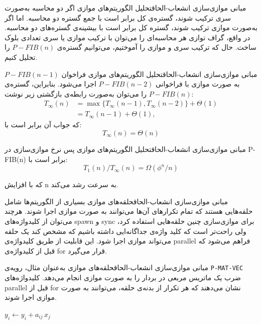 \begin{itemframe-s}{مبانی موازی‌سازی انشعاب-الحاق}{تحلیل الگوریتم‌های موازی}
\itm[1]
اگر دو محاسبه به‌صورت سری ترکیب شوند، گستره‌ی کل برابر است با جمع گستره دو محاسبه.
\itm[2]
اما اگر به‌صورت موازی ترکیب شوند، گستره کل برابر است با بیشینه‌ی گستره‌های دو محاسبه.
\itm
در واقع، گراف توازی هر محاسبه‌ای را می‌توان با ترکیب موازی یا سری تعدادی بلوک ساخت.
\itm
حال که ترکیب سری و موازی را آموختیم، می‌توانیم گستره‌ی
$P-FIB(n)$
را تحلیل کنیم.
\end{itemframe-s}


\begin{itemframe-s}{مبانی موازی‌سازی انشعاب-الحاق}{تحلیل الگوریتم‌های موازی}
\itm
فراخوان
$P-FIB(n-1)$
به صورت موازی با فراخوانی
$P-FIB(n-2)$
اجرا می‌شود. بنابراین، گستره‌ی
$P-FIB(n)$
را می‌توان به‌صورت رابطه‌ی بازگشتی زیر نوشت:
\begin{align*}
T_∞(n) &= \max\{T_∞(n-1), T_∞(n-2)\} + \Theta(1)\\
        &= T_∞(n-1) + \Theta(1),
\end{align*}
\itm
که جواب آن برابر است با:
$$T_∞(n) = \Theta(n)$$
\end{itemframe-s}


\begin{itemframe-s}{مبانی موازی‌سازی انشعاب-الحاق}{تحلیل الگوریتم‌های موازی}
\itm
پس نرخ موازی‌سازی در P-FIB(n) برابر است با:
$$
T_1(n) / T_∞(n) = \Omega(\phi^n / n)
$$

که با افزایش n به ‌سرعت رشد می‌کند.
\end{itemframe-s}


\begin{itemframe-s}{مبانی موازی‌سازی انشعاب-الحاق}{حلقه‌های موازی}
\itm
بسیاری از الگوریتم‌ها شامل حلقه‌هایی هستند که تمام تکرارهای آن‌ها می‌توانند به صورت موازی اجرا شوند.
\itm
هرچند می‌توان از کلیدواژه‌های spawn و sync برای موازی‌سازی چنین حلقه‌هایی استفاده کرد، ولی راحت‌تر است که کلید واژه‌ی جداگانه‌ایی داشته باشیم که مشخص کند یک حلقه می‌تواند موازی اجرا شود.
این قابلیت از طریق کلیدواژه‌ی parallel فراهم می‌شود که قبل از کلیدواژه‌ی for قرار می‌گیرد.



\end{itemframe-s}


\begin{itemframe-s}{مبانی موازی‌سازی انشعاب-الحاق}{حلقه‌های موازی}
\itm
به‌عنوان مثال، رویه‌ی
\texttt{P-MAT-VEC}
ضرب یک ماتریس مربعی در بردار را به صورت موازی انجام می‌دهد. کلیدواژه‌های parallel قبل از for نشان می‌دهند که هر تکرار از بدنه‌ی حلقه، می‌توانند به صورت موازی اجرا شوند.
\begin{algorithm}[H]\alglr
\caption{P-MAT-VEC}
\begin{algorithmic}[1]
   
     
      \State $y_i \gets y_i + a_{ij} \, x_j$
    \EndFor
  \EndpFor
\end{algorithmic}
\end{algorithm}
\end{itemframe-s}


